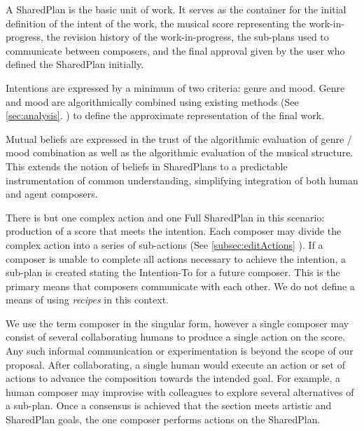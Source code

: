 \documentclass[final,authoryear,5p,times,twocolumn]{elsarticle}
\begin{document}
A SharedPlan is the basic unit of work. It serves as the container for the initial definition of the intent of the work, the musical score representing the work-in-progress, the revision history of the work-in-progress, the sub-plans used to communicate between composers, and the final approval given by the user who defined the SharedPlan initially.

Intentions are expressed by a minimum of two criteria: genre and mood. Genre and mood are algorithmically combined using existing methods (See \ref{sec:analysis}. ) to define the approximate representation of the final work.
  
Mutual beliefs are expressed in the trust of the algorithmic evaluation of genre / mood combination as well as the algorithmic evaluation of the musical structure. This extends the notion of beliefs in SharedPlans to a predictable instrumentation of common understanding, simplifying integration of both human and agent composers. 

There is but one complex action and one Full SharedPlan in this scenario: production of a score that meets the intention. Each composer may divide the complex action into a series of sub-actions (See \ref{subsec:editActions} ). If a composer is unable to complete all actions necessary to achieve the intention, a sub-plan is created stating the Intention-To for a future composer. This is the primary means that composers communicate with each other. We do not define a means of using \textit{recipes} in this context.

We use the term composer in the singular form, however a single composer may consist of several collaborating humans to produce a single action on the score. Any such informal communication or experimentation is beyond the scope of our proposal. After collaborating, a single human would execute an action or set of actions to advance the composition towards the intended goal. For example, a human composer may improvise with colleagues to explore several alternatives of a sub-plan. Once a consensus is achieved that the section meets artistic and SharedPlan goals, the one composer performs actions on the SharedPlan. 
\end{document}
